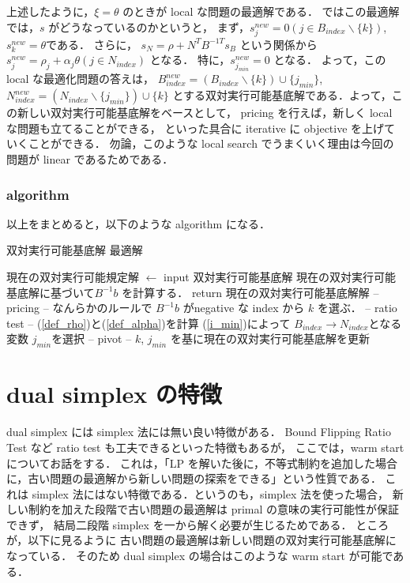 \documentclass[11pt, a4]{article}
\begin{document}
上述したように，$\xi = \theta$ のときが local な問題の最適解である．
ではこの最適解では，$s$ がどうなっているのかというと，
まず，$s^{new}_j = 0 (j \in B_{index}\backslash \{k\})$, $s^{new}_k = \theta$である．
さらに，
$s_N = \rho + N^TB^{-1T}s_B$ という関係から
$s^{new}_j = \rho_j + \alpha_j \theta (j\in N_{index})$ となる．
特に，$s^{new}_{j_{min}} = 0$ となる．
よって，この local な最適化問題の答えは，
$B^{new}_{index} = (B_{index}\backslash \{k\})\cup \{j_{min}\}$,
$N^{new}_{index} = (N_{index}\backslash \{j_{min}\})\cup \{k\}$
とする双対実行可能基底解である．よって，この新しい双対実行可能基底解をベースとして，
pricing を行えば，新しく local な問題も立てることができる，
といった具合に iterative に objective を上げていくことができる．
勿論，このような local search でうまくいく理由は今回の問題が linear であるためである．

\subsubsection{algorithm}
以上をまとめると，以下のような algorithm になる．
\begin{algorithm}
\begin{algorithmic}
  \REQUIRE 双対実行可能基底解
  \ENSURE 最適解

  現在の双対実行可能規定解 $\leftarrow$ input 双対実行可能基底解
  \LOOP
  \STATE 現在の双対実行可能基底解に基づいて$B^{-1}b$ を計算する．
  \STATE return 現在の双対実行可能基底解解
  \ENDIF
  \STATE -- pricing --
  \STATE なんらかのルールで $B^{-1}b$ がnegative な index から $k$ を選ぶ．
  \STATE -- ratio test --
  \STATE (\ref{def_rho})と(\ref{def_alpha})を計算
  \STATE (\ref{i_min})によって $B_{index}\rightarrow N_{index}$となる変数 $j_{min}$を選択
  \STATE -- pivot --
  \STATE $k$, $j_{min}$ を基に現在の双対実行可能基底解を更新
  \ENDLOOP
\end{algorithmic}
\end{algorithm}

\section{dual simplex の特徴}
dual simplex には simplex 法には無い良い特徴がある．
Bound Flipping Ratio Test など ratio test も工夫できるといった特徴もあるが，
ここでは，warm start についてお話をする．
これは，「LP を解いた後に，不等式制約を追加した場合に，古い問題の最適解から新しい問題の探索をできる」という性質である．
これは simplex 法にはない特徴である．というのも，simplex 法を使った場合，
新しい制約を加えた段階で古い問題の最適解は primal の意味の実行可能性が保証できず，
結局二段階 simplex を一から解く必要が生じるためである．
ところが，以下に見るように
古い問題の最適解は新しい問題の双対実行可能基底解になっている．
そのため dual simplex の場合はこのような warm start が可能である．
\end{document}
